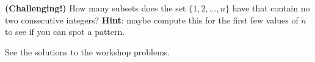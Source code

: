 \documentclass[11pt,dvipsnames]{book}
\numberwithin{equation}{section} %
\numberwithin{figure}{section} %
\numberwithin{table}{section} %
\begin{document}
\begin{exercise} {\bf (Challenging!)} How many subsets does the set $\{1,2, \dots ,n\}$ have that contain no two consecutive integers?  {\bf Hint}: maybe compute this for the first few values of $n$ to see if you can spot a pattern.

\begin{solution}
See the solutions to the workshop problems.
\end{solution}

\end{exercise} 


%
%
%
%
%
%
%
%
%
%
%
%
%



%
%
%
%
%
\end{document}
